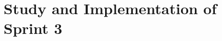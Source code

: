 \documentclass[pfe ,titlesmallcaps]{polypfe}
\begin{document}









\chapter{Study and Implementation of Sprint 3}
\clearpage














\newpage






\end{document}
